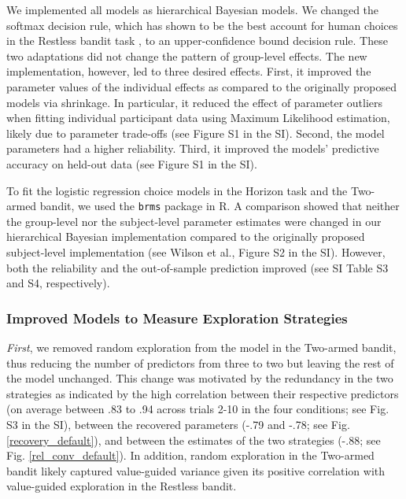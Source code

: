 \documentclass[fleqn,10pt]{wlscirep}
\begin{document}
We implemented all models as hierarchical Bayesian models. We changed the softmax decision rule, which has shown to be the best account for human choices in the Restless bandit task \cite{speekenbrink_uncertainty_2015, daw_cortical_2006}, to an upper-confidence bound decision rule. These two adaptations did not change the pattern of group-level effects. The new implementation, however, led to three desired effects. First, it improved the parameter values of the individual effects as compared to the originally proposed models via shrinkage. In particular, it reduced the effect of parameter outliers when fitting individual participant data using Maximum Likelihood estimation, likely due to parameter trade-offs (see Figure S1 in the SI). Second, the model parameters had a higher reliability. Third, it improved the models' predictive accuracy on held-out data (see Figure S1 in the SI).

To fit the logistic regression choice models in the Horizon task and the Two-armed bandit, we used the \texttt{brms} package\cite{Burkner2017-aw} in R\cite{R}. A comparison showed that neither the group-level nor the subject-level parameter estimates were changed in our hierarchical Bayesian implementation compared to the originally proposed subject-level implementation (see Wilson et al.\cite{wilson_humans_2014},  Figure S2 in the SI). However, both the reliability and the out-of-sample prediction improved (see SI Table S3 and S4, respectively).

\subsubsection*{Improved Models to Measure Exploration Strategies}
\textit{First}, we removed random exploration from the model in the Two-armed bandit, thus reducing the number of predictors from three to two but leaving the rest of the model unchanged. This change was motivated by the redundancy in the two strategies as indicated by the high correlation between their respective predictors (on average between .83 to .94 across trials 2-10 in the four conditions; see Fig. S3 in the SI)\cite{daoud_multicollinearity_2017}, between the recovered parameters (-.79 and -.78; see Fig. \ref{recovery_default}), and between the estimates of the two strategies (-.88; see Fig. \ref{rel_conv_default}). In addition, random exploration in the Two-armed bandit likely captured value-guided variance given its positive correlation with value-guided exploration in the Restless bandit.
\end{document}
